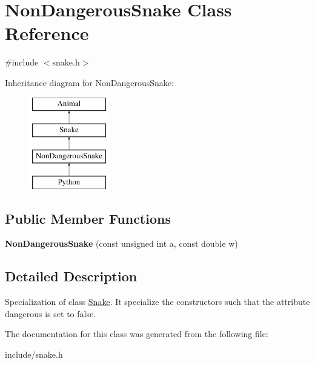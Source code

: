 \hypertarget{classNonDangerousSnake}{}\section{Non\+Dangerous\+Snake Class Reference}
\label{classNonDangerousSnake}


{\ttfamily \#include $<$snake.\+h$>$}

Inheritance diagram for Non\+Dangerous\+Snake\+:\begin{figure}[H]
\begin{center}
\leavevmode
\includegraphics[height=4.000000cm]{classNonDangerousSnake}
\end{center}
\end{figure}
\subsection*{Public Member Functions}
\begin{DoxyCompactItemize}
\item 
{\bfseries Non\+Dangerous\+Snake} (const unsigned int a, const double w)\hypertarget{classNonDangerousSnake_a3f5ac2522dd02fc5d55a34f30eec7e43}{}\label{classNonDangerousSnake_a3f5ac2522dd02fc5d55a34f30eec7e43}

\end{DoxyCompactItemize}


\subsection{Detailed Description}
Specialization of class \hyperlink{classSnake}{Snake}. It specialize the constructors such that the attribute {\ttfamily dangerous} is set to false. 

The documentation for this class was generated from the following file\+:\begin{DoxyCompactItemize}
\item 
include/snake.\+h\end{DoxyCompactItemize}
